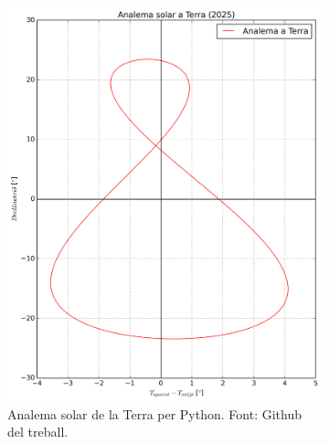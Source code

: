 \documentclass[a4paper, 11pt]{article}
\begin{document}
\begin{figure}[h!]
\begin{subfigure}{0.45\textwidth}
        \includegraphics[width=\textwidth]{images/analema_Terra.png}
        \caption{Analema solar de la Terra per Python. Font: Github del treball.}
    \end{subfigure}
    \begin{subfigure}{0.45\textwidth}
        \centering

\end{subfigure}
\end{figure}
\end{document}
